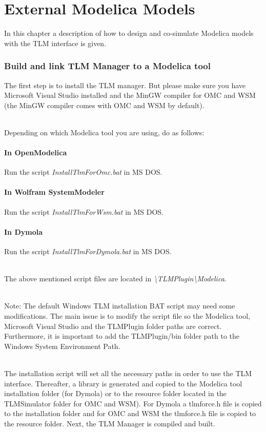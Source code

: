 \chapter{External Modelica Models}
\label{MMModelica}

In this chapter a description of how to design and co-simulate Modelica models with the TLM interface is given.

\subsection{Build and link TLM Manager to a Modelica tool}

The first step is to install the TLM manager. 
But please make sure you have Microsoft Visual Studio installed and the MinGW compiler for OMC and WSM (the MinGW compiler comes with OMC and WSM by default).

~\\Depending on which Modelica tool you are using, do as follows:

\subsubsection{In OpenModelica}
Run the script \textit{InstallTlmForOmc.bat} in MS DOS.

\subsubsection{In Wolfram SystemModeler}
Run the script \textit{InstallTlmForWsm.bat} in MS DOS.

\subsubsection{In Dymola}
Run the script \textit{InstallTlmForDymola.bat} in MS DOS.

~\\The above mentioned script files are located in \textit{\textbackslash TLMPlugin\textbackslash Modelica}.

~\\Note: The default Windows TLM installation BAT script may need some modifications.
The main issue is to modify the script file so the Modelica tool, Microsoft Visual Studio and the TLMPlugin folder paths are correct. 
Furthermore, it is important to add the TLMPlugin/bin folder path to the Windows System Environment Path. 
 

~\\ The installation script will set all the necessary paths in order to use the TLM interface. 
Thereafter, a library is generated and copied to the Modelica tool installation folder (for Dymola) or to the resource folder located in the TLMSimulator folder for OMC and WSM). 
For Dymola a tlmforce.h file is copied to the installation folder and for OMC and WSM the tlmforce.h file is copied to the resource folder. 
Next, the TLM Manager is compiled and built.

